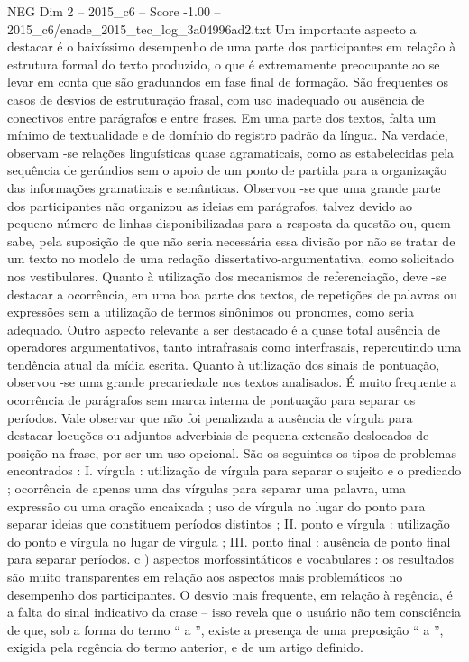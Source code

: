 \begin{textsample}{NEG Dim 2 – 2015\_c6 – Score -1.00 – 2015\_c6/enade\_2015\_tec\_log\_3a04996ad2.txt}
Um importante aspecto a destacar é o baixíssimo desempenho de uma parte dos participantes em relação à estrutura formal do texto produzido, o que é extremamente preocupante ao se levar em conta que são graduandos em fase final de formação.
São frequentes os casos de desvios de estruturação frasal, com uso inadequado ou ausência de conectivos entre parágrafos e entre frases.
Em uma parte dos textos, falta um mínimo de textualidade e de domínio do registro padrão da língua.
Na verdade, observam -se relações linguísticas quase agramaticais, como as estabelecidas pela sequência de gerúndios sem o apoio de um ponto de partida para a organização das informações gramaticais e semânticas.
Observou -se que uma grande parte dos participantes não organizou as ideias em parágrafos, talvez devido ao pequeno número de linhas disponibilizadas para a resposta da questão ou, quem sabe, pela suposição de que não seria necessária essa divisão por não se tratar de um texto no modelo de uma redação dissertativo-argumentativa, como solicitado nos vestibulares.
Quanto à utilização dos mecanismos de referenciação, deve -se destacar a ocorrência, em uma boa parte dos textos, de repetições de palavras ou expressões sem a utilização de termos sinônimos ou pronomes, como seria adequado.
Outro aspecto relevante a ser destacado é a quase total ausência de operadores argumentativos, tanto intrafrasais como interfrasais, repercutindo uma tendência atual da mídia escrita.
Quanto à utilização dos sinais de pontuação, observou -se uma grande precariedade nos textos analisados.
É muito frequente a ocorrência de parágrafos sem marca interna de pontuação para separar os períodos.
Vale observar que não foi penalizada a ausência de vírgula para destacar locuções ou adjuntos adverbiais de pequena extensão deslocados de posição na frase, por ser um uso opcional.
São os seguintes os tipos de problemas encontrados : I. vírgula : utilização de vírgula para separar o sujeito e o predicado ; ocorrência de apenas uma das vírgulas para separar uma palavra, uma expressão ou uma oração encaixada ; uso de vírgula no lugar do ponto para separar ideias que constituem períodos distintos ; II. ponto e vírgula : utilização do ponto e vírgula no lugar de vírgula ; III. ponto final : ausência de ponto final para separar períodos. c ) aspectos morfossintáticos e vocabulares : os resultados são muito transparentes em relação aos aspectos mais problemáticos no desempenho dos participantes.
O desvio mais frequente, em relação à regência, é a falta do sinal indicativo da crase – isso revela que o usuário não tem consciência de que, sob a forma do termo “ a ”, existe a presença de uma preposição “ a ”, exigida pela regência do termo anterior, e de um artigo definido.

\end{textsample}
